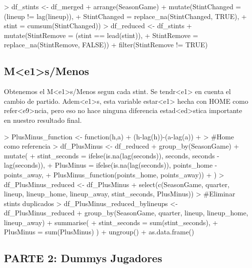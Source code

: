 \documentclass[paper=a4, fontsize=9pt]{article}
\begin{document}
\begin{Schunk}
\begin{Sinput}
> df_stints <- df_merged %
+   arrange(SeasonGame) %
+   mutate(StintChanged = (lineup != lag(lineup)),
+          StintChanged = replace_na(StintChanged, TRUE),
+          stint        = cumsum(StintChanged))
> df_reduced <- df_stints %
+   mutate(StintRemove  = (stint == lead(stint)),
+          StintRemove  = replace_na(StintRemove, FALSE)) %
+   filter(StintRemove != TRUE)
\end{Sinput}
\end{Schunk}


\subsection{M<e1>s/Menos}

Obtenemos el M<e1>s/Menos segun cada stint. Se tendr<e1> en cuenta el cambio de partido.
Adem<e1>s, esta variable estar<e1> hecha con HOME como refer<e9>ncia, pero eso no hace ninguna diferencia estad<ed>stica importante en nuestro resultado final.

\begin{Schunk}
\begin{Sinput}
> PlusMinus_function <- function(h,a){
+   (h-lag(h))-(a-lag(a))
+ }
> #Home como referencia
> df_PlusMinus <- df_reduced %
+   group_by(SeasonGame) %
+   mutate(
+     stint_seconds = ifelse(is.na(lag(seconds)), seconds, seconds - lag(seconds)),
+     PlusMinus  = ifelse(is.na(lag(seconds)), points_home - points_away,
+                        PlusMinus_function(points_home, points_away))
+   ) %
> df_PlusMinus_reduced <- df_PlusMinus %
+   select(c(SeasonGame, quarter, lineup, lineup_home, lineup_away, stint_seconds, PlusMinus)) 
> #Eliminar stints duplicados
> df_PlusMinus_reduced_bylineups <- df_PlusMinus_reduced %
+   group_by(SeasonGame, quarter, lineup, lineup_home, lineup_away) %
+   summarise(
+     stint_seconds = sum(stint_seconds),
+     PlusMinus  = sum(PlusMinus) ) %
+   ungroup() %
+   as.data.frame()
\end{Sinput}
\end{Schunk}

\subsection{PARTE 2: Dummys Jugadores}
\end{document}
